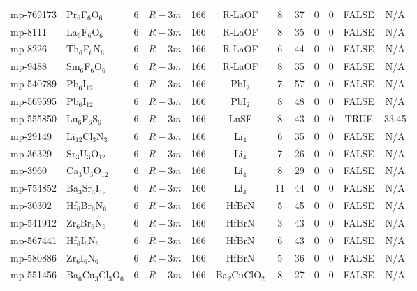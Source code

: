 {\begin{longtable}{llcccccccccc}
    mp-769173 & Pr$_{6}$F$_{6}$O$_{6}$ & 6     & $R-3m$ & 166   & R-LaOF & 8     & 37    & 0     & 0     & FALSE & N/A \\
    mp-8111 & La$_{6}$F$_{6}$O$_{6}$ & 6     & $R-3m$ & 166   & R-LaOF & 8     & 35    & 0     & 0     & FALSE & N/A \\
    mp-8226 & Th$_{6}$F$_{6}$N$_{6}$ & 6     & $R-3m$ & 166   & R-LaOF & 6     & 44    & 0     & 0     & FALSE & N/A \\
    mp-9488 & Sm$_{6}$F$_{6}$O$_{6}$ & 6     & $R-3m$ & 166   & R-LaOF & 8     & 35    & 0     & 0     & FALSE & N/A \\
    mp-540789 & Pb$_{6}$I$_{12}$ & 6     & $R-3m$ & 166   & PbI$_{2}$ & 7     & 57    & 0     & 0     & FALSE & N/A \\
    mp-569595 & Pb$_{6}$I$_{12}$ & 6     & $R-3m$ & 166   & PbI$_{2}$ & 8     & 48    & 0     & 0     & FALSE & N/A \\
    mp-555850 & Lu$_{6}$F$_{6}$S$_{6}$ & 6     & $R-3m$ & 166   & LuSF  & 8     & 43    & 0     & 0     & TRUE  & 33.45  \\
    mp-29149 & Li$_{12}$Cl$_{3}$N$_{3}$ & 6     & $R-3m$ & 166   & Li$_{4}$ & 6     & 35    & 0     & 0     & FALSE & N/A \\
    mp-36329 & Sr$_{3}$U$_{3}$O$_{12}$ & 6     & $R-3m$ & 166   & Li$_{4}$ & 7     & 26    & 0     & 0     & FALSE & N/A \\
    mp-3960 & Ca$_{3}$U$_{3}$O$_{12}$ & 6     & $R-3m$ & 166   & Li$_{4}$ & 8     & 29    & 0     & 0     & FALSE & N/A \\
    mp-754852 & Ba$_{3}$Sr$_{3}$I$_{12}$ & 6     & $R-3m$ & 166   & Li$_{4}$ & 11    & 44    & 0     & 0     & FALSE & N/A \\
    mp-30302 & Hf$_{6}$Br$_{6}$N$_{6}$ & 6     & $R-3m$ & 166   & HfBrN & 5     & 45    & 0     & 0     & FALSE & N/A \\
    mp-541912 & Zr$_{6}$Br$_{6}$N$_{6}$ & 6     & $R-3m$ & 166   & HfBrN & 3     & 43    & 0     & 0     & FALSE & N/A \\
    mp-567441 & Hf$_{6}$I$_{6}$N$_{6}$ & 6     & $R-3m$ & 166   & HfBrN & 6     & 43    & 0     & 0     & FALSE & N/A \\
    mp-580886 & Zr$_{6}$I$_{6}$N$_{6}$ & 6     & $R-3m$ & 166   & HfBrN & 5     & 36    & 0     & 0     & FALSE & N/A \\
    mp-551456 & Ba$_{6}$Cu$_{3}$Cl$_{3}$O$_{6}$ & 6     & $R-3m$ & 166   & Ba$_{2}$CuClO$_{2}$ & 8     & 27    & 0     & 0     & FALSE & N/A \\

\end{longtable}}
